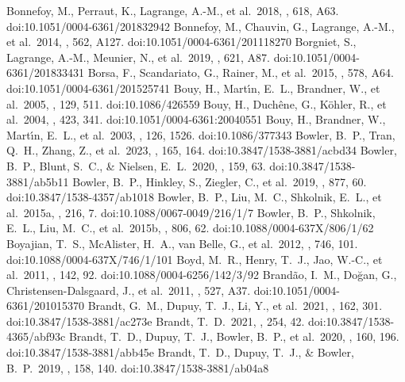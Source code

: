 \documentclass[twocolumn,tighten,twocolappendix]{aastex631}
\begin{document}
\begin{thebibliography}{}
 Bonnefoy, M., Perraut, K., Lagrange, A.-M., et al.\ 2018, \aap, 618, A63. doi:10.1051/0004-6361/201832942
 Bonnefoy, M., Chauvin, G., Lagrange, A.-M., et al.\ 2014, \aap, 562, A127. doi:10.1051/0004-6361/201118270
 Borgniet, S., Lagrange, A.-M., Meunier, N., et al.\ 2019, \aap, 621, A87. doi:10.1051/0004-6361/201833431
 Borsa, F., Scandariato, G., Rainer, M., et al.\ 2015, \aap, 578, A64. doi:10.1051/0004-6361/201525741
 Bouy, H., Mart{\'\i}n, E.~L., Brandner, W., et al.\ 2005, \aj, 129, 511. doi:10.1086/426559
 Bouy, H., Duch{\^e}ne, G., K{\"o}hler, R., et al.\ 2004, \aap, 423, 341. doi:10.1051/0004-6361:20040551
 Bouy, H., Brandner, W., Mart{\'\i}n, E.~L., et al.\ 2003, \aj, 126, 1526. doi:10.1086/377343
 Bowler, B.~P., Tran, Q.~H., Zhang, Z., et al.\ 2023, \aj, 165, 164. doi:10.3847/1538-3881/acbd34
 Bowler, B.~P., Blunt, S.~C., \& Nielsen, E.~L.\ 2020, \aj, 159, 63. doi:10.3847/1538-3881/ab5b11
 Bowler, B.~P., Hinkley, S., Ziegler, C., et al.\ 2019, \apj, 877, 60. doi:10.3847/1538-4357/ab1018
 Bowler, B.~P., Liu, M.~C., Shkolnik, E.~L., et al.\ 2015a, \apjs, 216, 7. doi:10.1088/0067-0049/216/1/7
 Bowler, B.~P., Shkolnik, E.~L., Liu, M.~C., et al.\ 2015b, \apj, 806, 62. doi:10.1088/0004-637X/806/1/62
 Boyajian, T.~S., McAlister, H.~A., van Belle, G., et al.\ 2012, \apj, 746, 101. doi:10.1088/0004-637X/746/1/101
 Boyd, M.~R., Henry, T.~J., Jao, W.-C., et al.\ 2011, \aj, 142, 92. doi:10.1088/0004-6256/142/3/92
 Brand{\~a}o, I.~M., Do{\u{g}}an, G., Christensen-Dalsgaard, J., et al.\ 2011, \aap, 527, A37. doi:10.1051/0004-6361/201015370
 Brandt, G.~M., Dupuy, T.~J., Li, Y., et al.\ 2021, \aj, 162, 301. doi:10.3847/1538-3881/ac273e
 Brandt, T.~D.\ 2021, \apjs, 254, 42. doi:10.3847/1538-4365/abf93c
 Brandt, T.~D., Dupuy, T.~J., Bowler, B.~P., et al.\ 2020, \aj, 160, 196. doi:10.3847/1538-3881/abb45e
 Brandt, T.~D., Dupuy, T.~J., \& Bowler, B.~P.\ 2019, \aj, 158, 140. doi:10.3847/1538-3881/ab04a8

\end{thebibliography}
\end{document}
